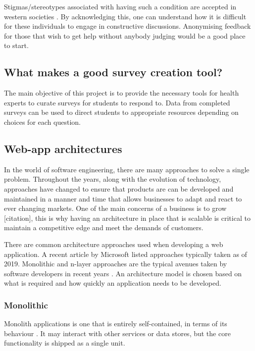 Stigmas/stereotypes associated with having such a condition are accepted in western societies \cite{corrigan2002paradox}.
By acknowledging this, one can understand how it is difficult for these individuals to engage in constructive discussions.
Anonymising feedback for those that wish to get help without anybody judging would be a good place to start. 

\subsection{What makes a good survey creation tool?}

The main objective of this project is to provide the necessary tools for health experts to curate surveys for students to respond to.
Data from completed surveys can be used to direct students to appropriate resources depending on choices for each question.


\subsection{Web-app architectures}
In the world of software engineering, there are many approaches to solve a single problem.
Throughout the years, along with the evolution of technology, approaches have changed to ensure that products are
can be developed and maintained in a manner and time that allows businesses to adapt and react to ever changing markets. 
One of the main concerns of a business is to grow [citation], this is why having an architecture in place that is scalable is
critical to maintain a competitive edge and meet the demands of customers.

There are common architecture approaches used when developing a web application.
A recent article by Microsoft listed approaches typically taken as of 2019. 
Monolithic and n-layer approaches are the typical avenues taken by software developers in recent years \cite{ardalis_common}.
An architecture model is chosen based on what is required and how quickly an application needs to be developed.

\subsubsection{Monolithic}
Monolith applications is one that is entirely self-contained, in terms of its behaviour \cite{ardalis_common}.
It may interact with other services or data stores, but the core functionality is shipped as a single unit.

